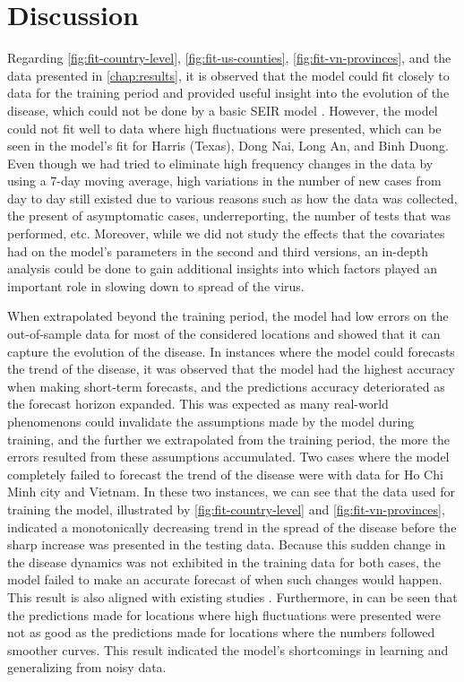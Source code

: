 \chapter{Discussion}
\label{chap:discussion}

Regarding \autoref{fig:fit-country-level}, \autoref{fig:fit-us-counties}, \autoref{fig:fit-vn-provinces}, and the data presented in \autoref{chap:results}, it is observed that the model could fit closely to data for the training period and provided useful insight into the evolution of the disease, which could not be done by a basic \gls{SEIR} model \cite{dandekarMachineLearningAidedGlobal2020a}.
However, the model could not fit well to data where high fluctuations were presented, which can be seen in the model's fit for Harris (Texas), Dong Nai, Long An, and Binh Duong.
Even though we had tried to eliminate high frequency changes in the data by using a 7-day moving average, high variations in the number of new cases from day to day still existed due to various reasons such as how the data was collected, the present of asymptomatic cases, underreporting, the number of tests that was performed, etc.
Moreover, while we did not study the effects that the covariates had on the model's parameters in the second and third versions, an in-depth analysis could be done to gain additional insights into which factors played an important role in slowing down to spread of the virus.

When extrapolated beyond the training period, the model had low errors on the out-of-sample data for most of the considered locations and showed that it can capture the evolution of the disease.
In instances where the model could forecasts the trend of the disease, it was observed that the model had the highest accuracy when making short-term forecasts, and the predictions accuracy deteriorated as the forecast horizon expanded.
This was expected as many real-world phenomenons could invalidate the assumptions made by the model during training, and the further we extrapolated from the training period, the more the errors resulted from these assumptions accumulated.
Two cases where the model completely failed to forecast the trend of the disease were with data for Ho Chi Minh city and Vietnam.
In these two instances, we can see that the data used for training the model, illustrated by \autoref{fig:fit-country-level} and \autoref{fig:fit-vn-provinces}, indicated a monotonically decreasing trend in the spread of the disease before the sharp increase was presented in the testing data.
Because this sudden change in the disease dynamics was not exhibited in the training data for both cases, the model failed to make an accurate forecast of when such changes would happen.
This result is also aligned with existing studies \cite{arikInterpretableSequenceLearning}.
Furthermore, in can be seen that the predictions made for locations where high fluctuations were presented were not as good as the predictions made for locations where the numbers followed smoother curves.
This result indicated the model's shortcomings in learning and generalizing from noisy data.

